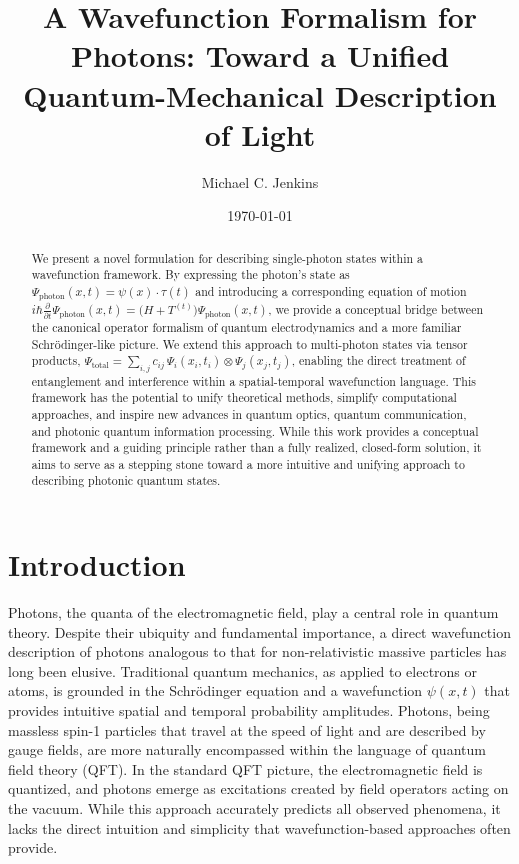 \documentclass[aps,prl,twocolumn,showpacs,showkeys,superscriptaddress,amsmath,amssymb]{revtex4-2}
\begin{document}
\title{A Wavefunction Formalism for Photons: Toward a Unified Quantum-Mechanical Description of Light}

\author{Michael C. Jenkins}

\date{\today}

\begin{abstract}
We present a novel formulation for describing single-photon states within a wavefunction framework. By expressing the photon’s state as $\Psi_{\text{photon}}(x,t) = \psi(x)\cdot \tau(t)$ and introducing a corresponding equation of motion $i\hbar \frac{\partial}{\partial t}\Psi_{\text{photon}}(x,t) = \bigl(H + T^{(t)}\bigr)\Psi_{\text{photon}}(x,t)$, we provide a conceptual bridge between the canonical operator formalism of quantum electrodynamics and a more familiar Schr\"odinger-like picture. We extend this approach to multi-photon states via tensor products, $\Psi_{\text{total}} = \sum_{i,j} c_{ij}\,\Psi_i(x_i,t_i)\otimes \Psi_j(x_j,t_j)$, enabling the direct treatment of entanglement and interference within a spatial-temporal wavefunction language. This framework has the potential to unify theoretical methods, simplify computational approaches, and inspire new advances in quantum optics, quantum communication, and photonic quantum information processing. While this work provides a conceptual framework and a guiding principle rather than a fully realized, closed-form solution, it aims to serve as a stepping stone toward a more intuitive and unifying approach to describing photonic quantum states.
\end{abstract}

\maketitle


\section{Introduction}
\label{sec:intro}

Photons, the quanta of the electromagnetic field, play a central role in quantum theory. Despite their ubiquity and fundamental importance, a direct wavefunction description of photons analogous to that for non-relativistic massive particles has long been elusive. Traditional quantum mechanics, as applied to electrons or atoms, is grounded in the Schr\"odinger equation and a wavefunction $\psi(x,t)$ that provides intuitive spatial and temporal probability amplitudes. Photons, being massless spin-1 particles that travel at the speed of light and are described by gauge fields, are more naturally encompassed within the language of quantum field theory (QFT). In the standard QFT picture, the electromagnetic field is quantized, and photons emerge as excitations created by field operators acting on the vacuum. While this approach accurately predicts all observed phenomena, it lacks the direct intuition and simplicity that wavefunction-based approaches often provide.
\end{document}
